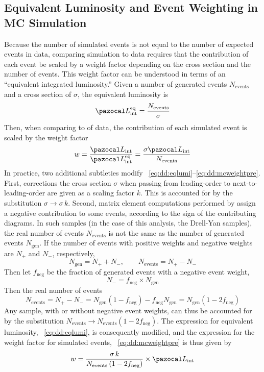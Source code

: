 \subsection{Equivalent Luminosity and Event Weighting in MC Simulation}
\label{sec:dd:EqLumi}
Because the number of simulated events is not equal to the number of expected events in data, comparing simulation to data requires that the contribution of each event be scaled by a weight factor depending on the cross section and the number of events.
This weight factor can be understood in terms of an ``equivalent integrated luminosity.''
Given a number of generated events $N_\text{events}$ and a cross section of $\sigma$, the equivalent luminosity is
\begin{equation}
  \intlumi^\text{eq} = \frac{N_\text{events}}{\sigma}
  \label{eq:dd:eqlumi}
\end{equation}
Then, when comparing to \intlumi of data, the contribution of each simulated event is scaled by the weight factor
\begin{equation}
  w = \frac{\intlumi}{\intlumi^\text{eq}} = \frac{\sigma\intlumi}{N_\text{events}}
  \label{eq:dd:mcweightpre}
\end{equation}
In practice, two additional subtleties modify \Eqs~\ref{eq:dd:eqlumi}--\ref{eq:dd:mcweightpre}.
First, corrections the cross section $\sigma$ when passing from leading-order to next-to-leading-order are given as a scaling factor $k$.
This is accounted for by the substitution $\sigma \to \sigma \, k$.
Second, matrix element computations performed by \MGvATNLO assign a negative contribution to some events, according to the sign of the contributing diagrams.
In such samples (in the case of this analysis, the Drell-Yan samples), the real number of events $N_\text{events}$ is not the same as the number of generated events $N_\text{gen}$.
If the number of events with positive weights and negative weights are $N_+$ and $N_-$, respectively,
$$N_{\text{gen}} = N_+ + N_-,\quad\quad N_\text{events} = N_+ - N_-$$
Then let $f_\text{neg}$ be the fraction of generated events with a negative event weight, \ie $$N_- = f_\text{neg} \times N_\text{gen}$$
Then the real number of events
\begin{equation}
  N_\text{events} = N_+ - N_- = N_\text{gen}\left(1 - f_\text{neg}\right) - f_\text{neg}N_\text{gen} = N_\text{gen}\left( 1-2f_\text{neg} \right)
  \label{eq:dd:neventsfrac}
\end{equation}
Any sample, with or without negative event weights, can thus be accounted for by the substitution $N_\text{events} \to N_\text{events}\left( 1-2f_\text{neg} \right)$.
The expression for equivalent luminosity, \Eq~\ref{eq:dd:eqlumi}, is consequently modified, and the expression for the weight factor for simulated events, \Eq~\ref{eq:dd:mcweightpre} is thus given by
\begin{equation}
  w = \frac{\sigma\,k}{N_\text{events}\left( 1-2f_\text{neg} \right)} \times \intlumi
  \label{eq:dd:mcweight}
\end{equation}

